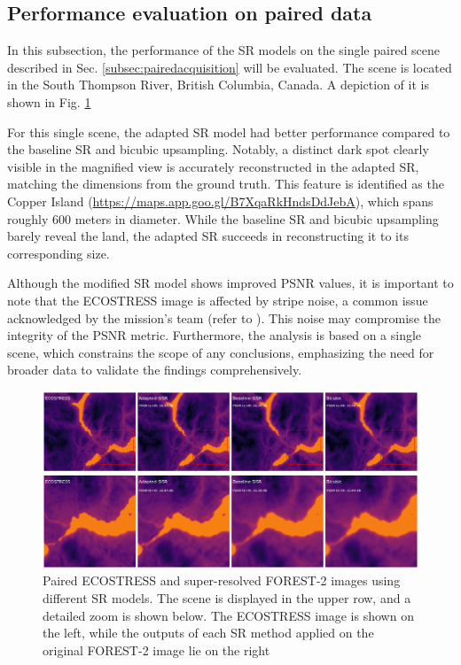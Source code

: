     \subsection{Performance evaluation on paired data}


        In this subsection, the performance of the SR models on the single paired scene described in Sec. \ref{subsec:pairedacquisition} will be evaluated. The scene is located in the South Thompson River, British Columbia, Canada. A depiction of it is shown in Fig. \ref{fig:5-crossover-performance}

        For this single scene, the adapted SR model had better performance compared to the baseline SR and bicubic upsampling. Notably, a distinct dark spot clearly visible in the magnified view is accurately reconstructed in the adapted SR, matching the dimensions from the ground truth. This feature is identified as the Copper Island (\url{https://maps.app.goo.gl/B7XqaRkHndsDdJebA}), which spans roughly 600 meters in diameter. While the baseline SR and bicubic upsampling barely reveal the land, the adapted SR succeeds in reconstructing it to its corresponding size.
        
        Although the modified SR model shows improved PSNR values, it is important to note that the ECOSTRESS image is affected by stripe noise, a common issue acknowledged by the mission's team (refer to \cite{ecostress2018datafaq}). This noise may compromise the integrity of the PSNR metric. Furthermore, the analysis is based on a single scene, which constrains the scope of any conclusions, emphasizing the need for broader data to validate the findings comprehensively.

    \begin{figure}[H]
        \centering
        \includegraphics[width=\textwidth]{Includes/5-crossover-performance.pdf}
        \caption{Paired ECOSTRESS and super-resolved FOREST-2 images using different SR models. The scene is displayed in the upper row, and a detailed zoom is shown below. The ECOSTRESS image is shown on the left, while the outputs of each SR method applied on the original FOREST-2 image lie on the right}
        \label{fig:5-crossover-performance}
    \end{figure}


